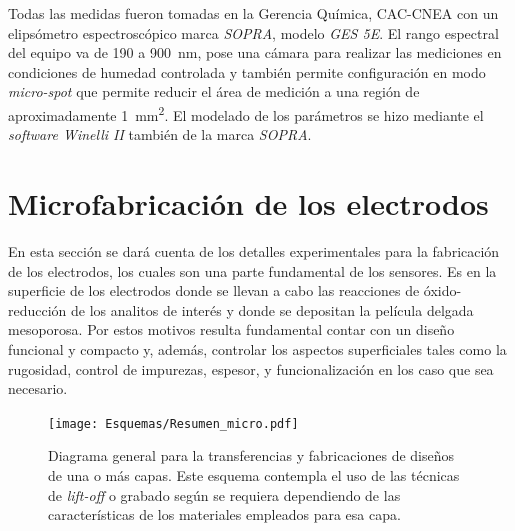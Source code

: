 		Todas las medidas fueron tomadas en la Gerencia Química, CAC-CNEA con un elipsómetro espectroscópico marca \textit{SOPRA}, modelo \textit{GES 5E}. El rango espectral del equipo va de 190 a \SI{900}{\nm}, pose una cámara para realizar las mediciones en condiciones de humedad controlada y también permite configuración en modo \textit{micro-spot} que permite reducir el área de medición a una región de aproximadamente \SI{1}{\mm^2}. El modelado de los parámetros se hizo mediante el \textit{software Winelli II} también de la marca \textit{SOPRA}.
			

\section{Microfabricación de los electrodos}
		
	 En esta sección se dará cuenta de los detalles experimentales para la fabricación de los electrodos, los cuales son una parte fundamental de los sensores. Es en la superficie de los electrodos donde se llevan a cabo las reacciones de óxido-reducción de los analitos de interés y donde se depositan la película delgada mesoporosa. Por estos motivos resulta fundamental contar con un diseño funcional y compacto y, además, controlar los aspectos superficiales tales como la rugosidad, control de impurezas, espesor, y funcionalización en los caso que sea necesario.

	 \begin{figure}[h!]
			  \begin{center}
			  \texttt{[image: Esquemas/Resumen\_micro.pdf]}
			  \caption[Esquema para la transferencia de los diseños]{Diagrama general para la transferencias y fabricaciones de diseños de una o más capas. Este esquema contempla el uso de las técnicas de \textit{lift-off }o grabado según se requiera dependiendo de las características de los materiales empleados para esa capa.}
			  \label{esq:micro}
			  \end{center}
			  \end{figure}


